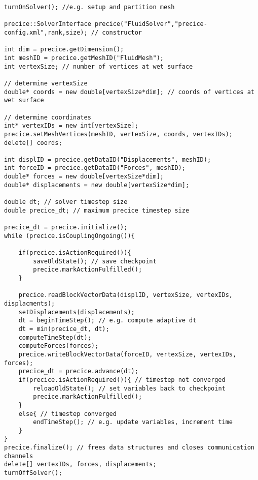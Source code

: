 \lstset{language=C++}
\begin{lstlisting}[caption=preCICE adapter structure,label=adapter-struct]
turnOnSolver(); //e.g. setup and partition mesh 

precice::SolverInterface precice("FluidSolver","precice-config.xml",rank,size); // constructor

int dim = precice.getDimension();
int meshID = precice.getMeshID("FluidMesh");
int vertexSize; // number of vertices at wet surface 

// determine vertexSize
double* coords = new double[vertexSize*dim]; // coords of vertices at wet surface 

// determine coordinates
int* vertexIDs = new int[vertexSize];
precice.setMeshVertices(meshID, vertexSize, coords, vertexIDs); 
delete[] coords;

int displID = precice.getDataID("Displacements", meshID); 
int forceID = precice.getDataID("Forces", meshID); 
double* forces = new double[vertexSize*dim];
double* displacements = new double[vertexSize*dim];

double dt; // solver timestep size
double precice_dt; // maximum precice timestep size

precice_dt = precice.initialize();
while (precice.isCouplingOngoing()){
	
	if(precice.isActionRequired()){
		saveOldState(); // save checkpoint
		precice.markActionFulfilled();
	}

	precice.readBlockVectorData(displID, vertexSize, vertexIDs, displacments);
	setDisplacements(displacements);
	dt = beginTimeStep(); // e.g. compute adaptive dt 
	dt = min(precice_dt, dt);
	computeTimeStep(dt);
	computeForces(forces);
	precice.writeBlockVectorData(forceID, vertexSize, vertexIDs, forces);
	precice_dt = precice.advance(dt);
	if(precice.isActionRequired()){ // timestep not converged
		reloadOldState(); // set variables back to checkpoint
		precice.markActionFulfilled();
	}
	else{ // timestep converged
		endTimeStep(); // e.g. update variables, increment time
	}
}
precice.finalize(); // frees data structures and closes communication channels
delete[] vertexIDs, forces, displacements;
turnOffSolver();
\end{lstlisting}
